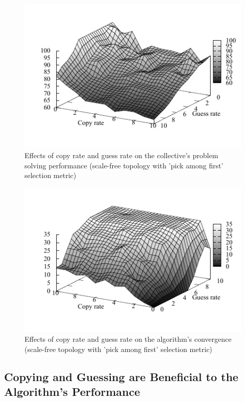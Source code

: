 \documentclass{article}
\begin{document}
\begin{figure}
\includegraphics[scale=1]{ijcai_sudoku/first_iter}
\caption{Effects of copy rate and guess rate on the collective's problem solving performance (scale-free topology with 'pick among first' selection metric)
}
\label{fig:copy_guess_free_prob}
\end{figure}

\begin{figure}
\includegraphics[scale=1]{ijcai_sudoku/first_suc}
\caption{Effects of copy rate and guess rate on the algorithm's convergence (scale-free topology with 'pick among first' selection metric)
}
\label{fig:copy_guess_free_prob_num_solution_reached}
\end{figure}

\subsection{Copying and Guessing are Beneficial to the Algorithm's Performance}
\end{document}
